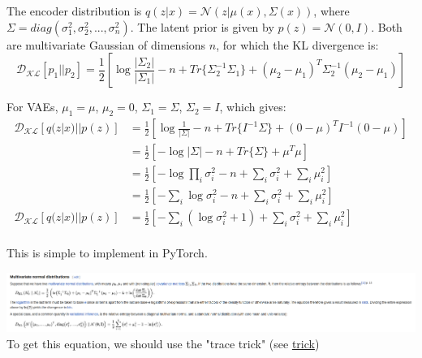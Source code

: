 The encoder distribution is $q(z|x) = \mathcal{N}(z|\mu(x),\Sigma(x))$, where $\Sigma=diag(\sigma_1^2, \sigma_2^2, ..., \sigma_n^2)$.
The latent prior is given by $p(z) = \mathcal{N}(0, I)$.
Both are multivariate Gaussian of dimensions $n$, for which the KL divergence is:
\begin{equation}
    \mathcal{D_{KL}}[p_1||p_2] = \frac{1}{2} \left[ \log \frac{|\Sigma_2|}{|\Sigma_1|} - n + Tr\{\Sigma_2^{-1}\Sigma_1\} + (\mu_2 - \mu_1)^T \Sigma_2^{-1} (\mu_2-\mu_1) \right]
\end{equation}

For VAEs, $\mu_1 = \mu$, $\mu_2 = 0$, $\Sigma_1 = \Sigma$, $\Sigma_2 = I$, which gives:
\begin{equation}
    \begin{split}
        \mathcal{D_{KL}}[q(z|x)||p(z)] &= \frac{1}{2} \left[ \log \frac{1}{|\Sigma|} - n + Tr\{I^{-1}\Sigma\} + (0 - \mu)^T I^{-1} (0-\mu) \right] \\
        &= \frac{1}{2} \left[ -\log |\Sigma| - n + Tr\{\Sigma\} + \mu^T\mu \right] \\
        &= \frac{1}{2} \left[ -\log \prod_i \sigma_i^2 - n + \sum_i \sigma_i^2 + \sum_i \mu_i^2 \right] \\
        &= \frac{1}{2} \left[ -\sum_i \log\sigma_i^2 - n + \sum_i \sigma_i^2 + \sum_i \mu_i^2 \right] \\
        \mathcal{D_{KL}}[q(z|x)||p(z)] &= \frac{1}{2} \left[ -\sum_i(\log\sigma_i^2 + 1) + \sum_i \sigma_i^2 + \sum_i \mu_i^2 \right] \\
    \end{split}
\end{equation}

This is simple to implement in PyTorch.

\includegraphics[scale=1]{content/KL_gaussians.png}
To get this equation, we should use the "trace trick" (see \href{https://en.wikipedia.org/wiki/Estimation_of_covariance_matrices#The_trace_of_a_1_.C3.97_1_matrix}{trick})
